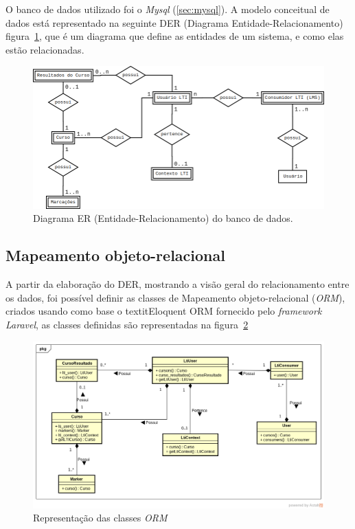 O banco de dados utilizado foi o \textit{Mysql} (\autoref{sec:mysql}). A modelo conceitual de dados está representado na seguinte DER (Diagrama Entidade-Relacionamento) figura~\ref{fig:diagrama-er}, que é um diagrama que define as entidades de um sistema, e como elas estão relacionadas.

\begin{figure}[h]
    \centering
    \includegraphics[keepaspectratio=true,scale=0.4]{figuras/der_video_interativo.png}
    \caption{Diagrama ER (Entidade-Relacionamento) do banco de dados.}
    \label{fig:diagrama-er}
\end{figure}

\subsection{Mapeamento objeto-relacional}

A partir da elaboração do DER, mostrando a visão geral do relacionamento entre os dados, foi possível definir as classes de Mapeamento objeto-relacional (\textit{ORM}), criados usando como base o textit{Eloquent ORM} fornecido pelo \textit{framework Laravel}, as classes definidas são representadas na figura~\ref{fig:diagrama_classe_eloquent}

\begin{figure}[htpb]
  \centering
  \includegraphics[width=1.0\linewidth]{figuras/diagrama_classe_eloquent.png}
  \caption{Representação das classes \textit{ORM}}
  \label{fig:diagrama_classe_eloquent}
\end{figure}

